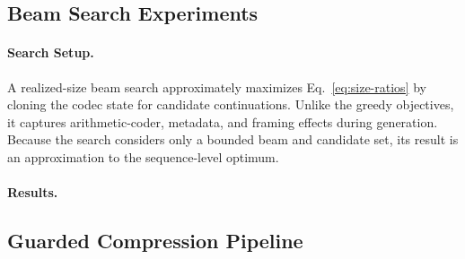 

\subsection{Beam Search Experiments}
\label{app:beam-search}

\paragraph{Search Setup.}
A realized-size beam search approximately maximizes Eq.~\ref{eq:size-ratios}
by cloning the codec state for candidate continuations. Unlike the greedy
objectives, it captures arithmetic-coder, metadata, and framing effects during
generation. Because the search considers only a bounded beam and candidate set,
its result is an approximation to the sequence-level optimum.

\paragraph{Results.}

\subsection{Guarded Compression Pipeline}

